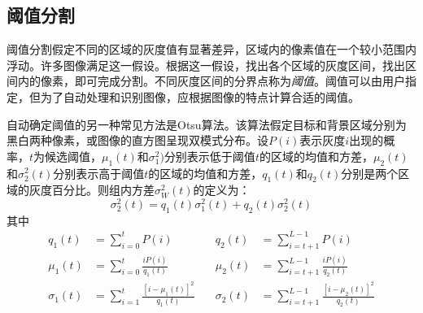\subsection{阈值分割}

阈值分割假定不同的区域的灰度值有显著差异，区域内的像素值在一个较小范围内浮动。许多图像满足这一假设。根据这一假设，找出各个区域的灰度区间，找出区间内的像素，即可完成分割。不同灰度区间的分界点称为\emph{阈值}。阈值可以由用户指定，但为了自动处理和识别图像，应根据图像的特点计算合适的阈值。


自动确定阈值的另一种常见方法是Otsu算法。该算法假定目标和背景区域分别为黑白两种像素，或图像的直方图呈现双模式分布。设$P(i)$表示灰度$i$出现的概率，$t$为候选阈值，$\mu_1(t)$和$\sigma_1^2)$分别表示低于阈值$t$的区域的均值和方差，$\mu_2(t)$和$\sigma_2^2(t)$分别表示高于阈值$t$的区域的均值和方差，$q_1(t)$和$q_2(t)$分别是两个区域的灰度百分比。则组内方差$\sigma_W^2(t)$的定义为：
\begin{equation}
  \label{eq:sigw}
  \sigma_2^2(t)=q_1(t)\sigma_1^2(t)+q_2(t)\sigma_2^2(t)
\end{equation}
其中
\begin{equation}
  \label{eq:musig}
  \begin{aligned}
    q_1(t) &= \sum_{i=0}^tP(i) \quad & q_2(t) &= \sum_{i=t+1}^{L-1}P(i) \\
    \mu_1(t) &= \sum_{i=0}^t\frac{iP(i)}{q_1(t)} \quad & \mu_2(t) &= \sum_{i=t+1}^{L-1}\frac{iP(i)}{q_2(t)} \\
    \sigma_1(t) &= \sum_{i=1}^t\frac{[i-\mu_1(t)]^2}{q_1(t)} \quad & \sigma_2(t) &= \sum_{i=t+1}^{L-1}\frac{[i-\mu_2(t)]^2}{q_2(t)}
  \end{aligned}
\end{equation}

